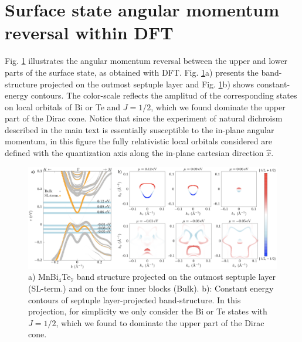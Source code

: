 \documentclass[showpacs, preprintnumbers, pra, superscriptaddress, floatfix, onecolumn, longbibliography]{revtex4-1}
\begin{document}
\section{Surface state angular momentum reversal within DFT}
Fig. \ref{dft_sl} illustrates the angular momentum reversal between the upper and lower parts of the surface state, as obtained with DFT. 
Fig. \ref{dft_sl}a) presents the band-structure projected on the outmost septuple layer and Fig. \ref{dft_sl}b) shows constant-energy contours. The color-scale reflects the amplitud of the corresponding states on local orbitals of Bi or Te and $J=1/2$, which we found dominate the upper part of the Dirac cone.
Notice that since the experiment of natural dichroism described in the main text is essentially susceptible to the in-plane angular momentum, in this figure the fully relativistic local orbitals considered are defined with the quantization axis along the in-plane cartesian direction $\hat{x}$.
\begin{figure}[h!]
 \centering
 \includegraphics[width=18 cm]{sl.png}
	\caption{a) MnBi$_4$Te$_7$ band structure projected on the outmost septuple layer (SL-term.) and on the four inner blocks (Bulk). 
	b): Constant energy contours of septuple layer-projected band-structure. In this projection, for simplicity we only consider the Bi or Te states with $J=1/2$, which we found to dominate the upper part of the Dirac cone.
	}
	\label{dft_sl}
\end{figure}



\end{document}
